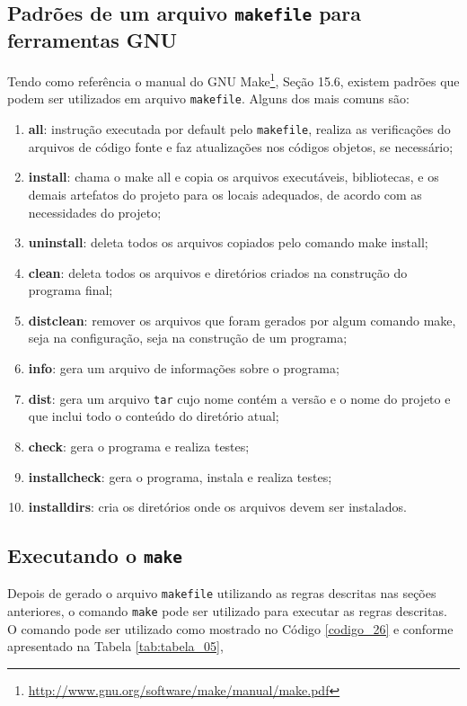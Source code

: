 \subsection{Padrões de um arquivo \texttt{makefile} para ferramentas GNU}

    
Tendo como referência o manual do GNU Make\footnote{
\url{http://www.gnu.org/software/make/manual/make.pdf}},
Seção 15.6, existem padrões que podem ser utilizados em arquivo
 \texttt{makefile}. Alguns dos mais comuns são:

\begin{enumerate}
    \item \textbf{all}: instrução executada por default pelo \texttt{makefile}, 
realiza as verificações do arquivos de código fonte e faz atualizações
 nos códigos objetos, se necessário;
    \item \textbf{install}: chama o make all e copia os arquivos 
executáveis, bibliotecas, e os demais artefatos do projeto para os 
locais adequados, de acordo com as necessidades do projeto;
    \item \textbf{uninstall}: deleta todos os arquivos copiados 
pelo comando make install;
    \item \textbf{clean}: deleta todos os arquivos e diretórios 
criados na construção do programa final;
    \item \textbf{distclean}: remover os arquivos que foram gerados
 por algum comando make, seja na configuração, seja na
 construção de um programa;
    \item \textbf{info}: gera um arquivo de informações sobre o programa;
    \item \textbf{dist}: gera um arquivo \texttt{tar} cujo nome contém a versão e
o nome do projeto e  que inclui  todo o conteúdo do diretório atual;
    \item \textbf{check}: gera o programa  e realiza testes;
    \item \textbf{installcheck}: gera o programa, instala e realiza testes;
    \item \textbf{installdirs}: cria  os diretórios onde os arquivos devem ser instalados.
\end{enumerate}


\subsection{Executando o \texttt{make}}

Depois de gerado o arquivo \texttt{makefile} utilizando as regras descritas nas seções anteriores,
 o comando \texttt{make} pode ser utilizado para executar as regras descritas.
O comando pode ser utilizado como mostrado no Código \ref{codigo_26} e conforme apresentado na Tabela \ref{tab:tabela_05},


